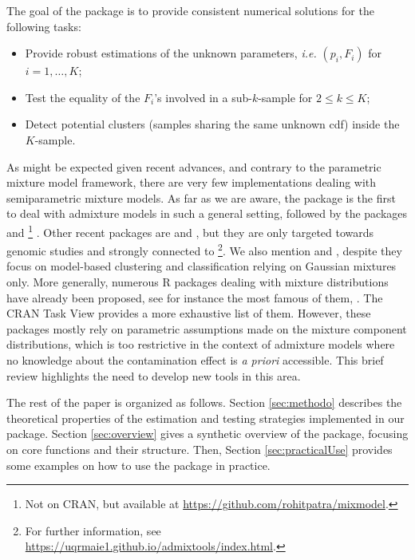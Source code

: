 The goal of the package  is to provide consistent numerical solutions for the following tasks:

\begin{itemize}
\tightlist
\item
  Provide robust estimations of the unknown parameters, \emph{i.e.} \((p_i,F_i)\) for \(i=1,\dots,K\);
\item
  Test the equality of the \(F_i\)'s involved in a sub-\(k\)-sample for \(2 \leq k \leq K\);
\item
  Detect potential clusters (samples sharing the same unknown cdf) inside the \(K\)-sample.
\end{itemize}

As might be expected given recent advances, and contrary to the parametric mixture model framework, there are very few implementations dealing with semiparametric mixture models. As far as we are aware, the  package is the first to deal with admixture models in such a general setting, followed by the packages  \citep{Kang+Shen+Yao+Xiang+Ge:2023} and \footnote{Not on CRAN, but available at \url{https://github.com/rohitpatra/mixmodel}.} \citep{Patra+Sen:2016}. Other recent packages are  \citep{Petr:2020} and  \citep{Leppala+Nielsen+Mailund:2017}, but they are only targeted towards genomic studies and strongly connected to \footnote{For further information, see \url{https://uqrmaie1.github.io/admixtools/index.html}.}. We also mention  \citep{Scrucca+Fraley+Murphy+Raftery:2023} and  \citep{Punzo+Mazza+McNicholas:2018}, despite they focus on model-based clustering and classification relying on Gaussian mixtures only. More generally, numerous R packages dealing with mixture distributions have already been proposed, see for instance the most famous of them,  \citep{Benaglia+Chauveau+Hunter+Young:2009}. The CRAN Task View  provides a more exhaustive list of them. However, these packages mostly rely on parametric assumptions made on the mixture component distributions, which is too restrictive in the context of admixture models where no knowledge about the contamination effect is \emph{a priori} accessible. This brief review highlights the need to develop new tools in this area.

The rest of the paper is organized as follows. Section \ref{sec:methodo} describes the theoretical properties of the estimation and testing strategies implemented in our package. Section \ref{sec:overview} gives a synthetic overview of the package, focusing on core functions and their structure. Then, Section \ref{sec:practicalUse} provides some examples on how to use the package in practice.

